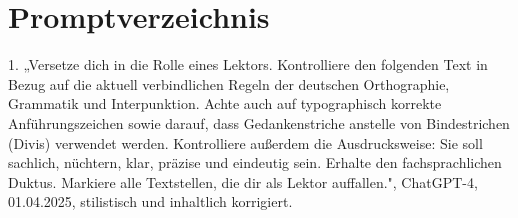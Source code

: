 \chapter*{Promptverzeichnis}


1. „Versetze dich in die Rolle eines Lektors. Kontrolliere den folgenden Text in Bezug auf die aktuell verbindlichen Regeln der deutschen Orthographie, Grammatik und Interpunktion. Achte auch auf typographisch korrekte Anführungszeichen sowie darauf, dass Gedankenstriche anstelle von Bindestrichen (Divis) verwendet werden. Kontrolliere außerdem die Ausdrucksweise: Sie soll sachlich, nüchtern, klar, präzise und eindeutig sein. Erhalte den fachsprachlichen Duktus. Markiere alle Textstellen, die dir als Lektor auffallen.", ChatGPT-4, 01.04.2025, stilistisch und inhaltlich korrigiert.